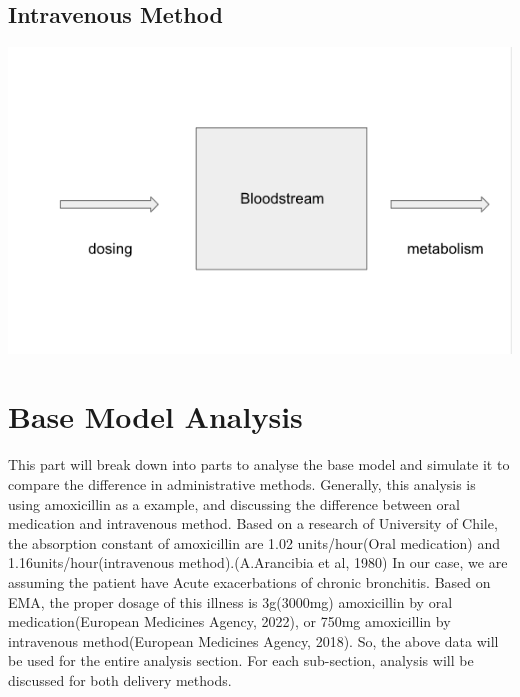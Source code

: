 \documentclass{article}
\begin{document}
\subsection*{Intravenous Method}

\begin{center}
    \includegraphics[scale = 0.5]{bloodstream.png}
\end{center}

\section*{Base Model Analysis}
This part will break down into parts to analyse the base model and simulate it to compare the difference in administrative methods. Generally, this analysis is using amoxicillin as a example, and discussing the difference between oral medication and intravenous method. Based on a research of University of Chile, the absorption constant of amoxicillin are 1.02 units/hour(Oral medication) and 1.16units/hour(intravenous method).(A.Arancibia et al, 1980) In our case, we are assuming the patient have Acute exacerbations of chronic bronchitis. Based on EMA, the proper dosage of this illness is 3g(3000mg) amoxicillin by oral medication(European Medicines Agency, 2022), or 750mg amoxicillin by intravenous method(European Medicines Agency, 2018). So, the above data will be used for the entire analysis section. For each sub-section, analysis will be discussed for both delivery methods. 
\end{document}

